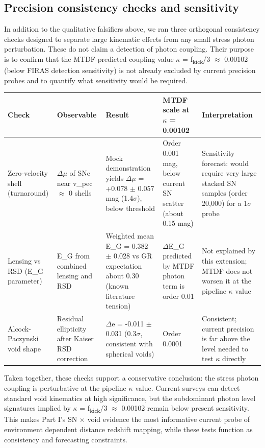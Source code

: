 \documentclass[11pt,a4paper]{article}
\begin{document}
\subsection{Precision consistency checks and sensitivity}
In addition to the qualitative falsifiers above, we ran three orthogonal consistency checks designed to separate large kinematic effects from any small stress photon perturbation. These do not claim a detection of photon coupling. Their purpose is to confirm that the MTDF-predicted coupling value $\kappa$ = f\textsubscript{kick}/3 $\approx$ 0.00102 (below FIRAS detection sensitivity) is not already excluded by current precision probes and to quantify what sensitivity would be required.

\begin{table}[H]
\centering
\footnotesize
\begin{tabularx}{\linewidth}{l>{\RaggedRight\arraybackslash}X>{\RaggedRight\arraybackslash}X>{\RaggedRight\arraybackslash}X>{\RaggedRight\arraybackslash}X}
\toprule
\textbf{Check} & \textbf{Observable} & \textbf{Result} & \textbf{MTDF scale at $\kappa$ = 0.00102} & \textbf{Interpretation} \tabularnewline
\midrule
Zero-velocity shell (turnaround) & $\Delta$$\mu$ of SNe near v\_\allowbreak{}pec $\approx$ 0 shells & Mock demonstration yields $\Delta$$\mu$ = +0.078 $\pm$ 0.057 mag (1.4$\sigma$), below threshold & Order 0.001 mag, below current SN scatter (about 0.15 mag) & Sensitivity forecast: would require very large stacked SN samples (order 20,000) for a 1$\sigma$ probe \tabularnewline
Lensing vs RSD (E\_\allowbreak{}G parameter) & E\_\allowbreak{}G from combined lensing and RSD & Weighted mean E\_\allowbreak{}G = 0.382 $\pm$ 0.028 vs GR expectation about 0.30 (known literature tension) & $\Delta$E\_\allowbreak{}G predicted by MTDF photon term is order 0.01 & Not explained by this extension; MTDF does not worsen it at the pipeline $\kappa$ value \tabularnewline
Alcock-Paczynski void shape & Residual ellipticity after Kaiser RSD correction & $\Delta$e = -0.011 $\pm$ 0.031 (0.3$\sigma$, consistent with spherical voids) & Order 0.0001 & Consistent; current precision is far above the level needed to test $\kappa$ directly \tabularnewline
\bottomrule
\end{tabularx}
\end{table}

Taken together, these checks support a conservative conclusion: the stress photon coupling is perturbative at the pipeline $\kappa$ value. Current surveys can detect standard void kinematics at high significance, but the subdominant photon level signatures implied by $\kappa$ = f\textsubscript{kick}/3 $\approx$ 0.00102 remain below present sensitivity. This makes Part I's SN $\times$ void evidence the most informative current probe of environment dependent distance redshift mapping, while these tests function as consistency and forecasting constraints.
\end{document}
